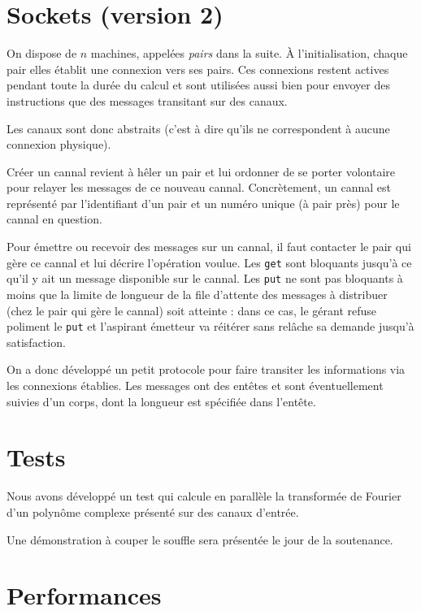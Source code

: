\documentclass[a4paper]{article}
\begin{document}
\section{Sockets (version 2)}

On dispose de $n$ machines, appelées \emph{pairs} dans la suite.
À l'initialisation, chaque pair elles établit une connexion vers ses pairs.
Ces connexions restent actives pendant toute la durée du calcul et sont utilisées aussi bien pour envoyer des instructions
que des messages transitant sur des canaux.

Les canaux sont donc abstraits (c'est à dire qu'ils ne correspondent à aucune connexion physique).

Créer un cannal revient à hêler un pair et lui ordonner de se porter volontaire pour relayer les
messages de ce nouveau cannal. Concrètement, un cannal est représenté par l'identifiant d'un pair et
un numéro unique (à pair près) pour le cannal en question.

Pour émettre ou recevoir des messages sur un cannal, il faut contacter le pair qui gère ce cannal et
lui décrire l'opération voulue. Les \texttt{get} sont bloquants jusqu'à ce qu'il y ait un message disponible
sur le cannal. Les \texttt{put} ne sont pas bloquants à moins que la limite de longueur de la file d'attente
des messages à distribuer (chez le pair qui gère le cannal) soit atteinte : dans ce cas, le gérant refuse
poliment le \texttt{put} et l'aspirant émetteur va réitérer sans relâche sa demande jusqu'à satisfaction.

On a donc développé un petit protocole pour faire transiter les informations via les connexions établies.
Les messages ont des entêtes et sont éventuellement suivies d'un corps, dont la longueur est spécifiée dans l'entête.

\section{Tests}

Nous avons développé un test qui calcule en parallèle la transformée de Fourier d'un polynôme complexe présenté sur des canaux
d'entrée.

Une démonstration à couper le souffle sera présentée le jour de la soutenance.

\section{Performances}
\end{document}
